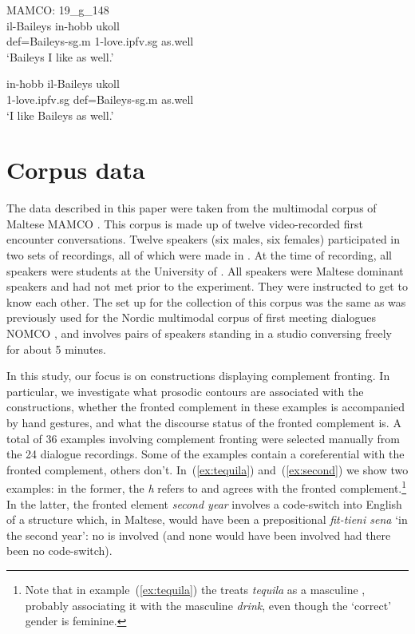 \documentclass[output=paper]{LSP/langsci}
\begin{document}
\ea\label{ex:top:m1}
{MAMCO: 19\_g\_148}\\
\gll il-Baileys in-ħobb ukoll\\
     {\sc def}=Baileys-{\sc sg.m} 1-love.{\sc ipfv.sg} as.well\\
\glt `Baileys I like as well.'
\z


\ea\label{ex:nontop:m1}
\gll in-ħobb il-Baileys ukoll\\
     1-love.{\sc ipfv.sg} {\sc def}=Baileys-{\sc sg.m} as.well\\
\glt `I like Baileys as well.'
\z


\section{Corpus data}
\label{section:data}

The data described in this paper were taken from the multimodal corpus
of Maltese MAMCO \citep{PaggioVella14}. This corpus is made up of
twelve video-recorded first encounter conversations. Twelve speakers
(six males, six females) participated in two sets of recordings, all
of which were made in . At the time of recording, all
speakers were students at the University of . All speakers were
Maltese dominant speakers and had not met prior to the
experiment. They were instructed to get to know each other. The set up
for the collection of this corpus was the same as was previously used
for the Nordic multimodal corpus of first meeting dialogues NOMCO
\citep{nomco-lrec10}, and involves pairs of speakers standing in a
studio conversing freely for about 5 minutes.

In this study, our focus is on constructions displaying complement
fronting. In particular, we investigate what prosodic contours are
associated with the constructions, whether the fronted complement in
these examples is accompanied by hand gestures, and what the discourse
status of the fronted complement is. A total of 36 examples involving
complement fronting were selected manually from the 24 dialogue
recordings. Some of the examples contain a  
coreferential with the fronted complement, others don't.
In~(\ref{ex:tequila}) and~(\ref{ex:second}) we show two examples: in
the former, the  {\em h} refers to and agrees with the fronted
complement.\footnote{Note that in example~(\ref{ex:tequila}) the
   treats {\em tequila} as a masculine , probably
  associating it with the masculine {\em drink}, even though the
  `correct'  gender is feminine.}  In the latter, the
fronted element {\em second year} involves a code-switch into English
of a structure which, in Maltese, would have been a prepositional
 {\em fit-tieni sena} `in the second year’: no  is involved
(and none would have been involved had there been no code-switch).
\end{document}
